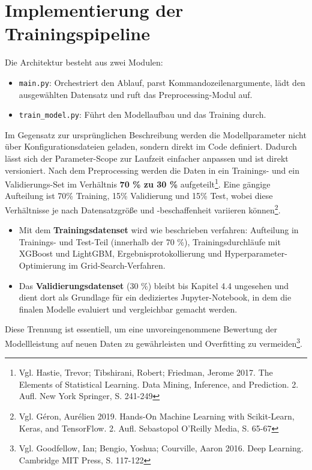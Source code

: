 \section{Implementierung der Trainingspipeline}

Die Architektur besteht aus zwei Modulen:

\begin{itemize}
  \item \texttt{main.py}: Orchestriert den Ablauf, parst Kommandozeilenargumente, lädt den ausgewählten Datensatz und ruft das Preprocessing-Modul auf.
  \item \texttt{train\_model.py}: Führt den Modellaufbau und das Training durch.
\end{itemize}

Im Gegensatz zur ursprünglichen Beschreibung werden die Modellparameter nicht über Konfigurationsdateien geladen, sondern direkt im Code definiert. Dadurch lässt sich der Parameter-Scope zur Laufzeit einfacher anpassen und ist direkt versioniert. Nach dem Preprocessing werden die Daten in ein Trainings- und ein Validierungs-Set im Verhältnis \textbf{70 \% zu 30 \%} aufgeteilt\footnote{Vgl. Hastie, Trevor; Tibshirani, Robert; Friedman, Jerome 2017. The Elements of Statistical Learning. Data Mining, Inference, and Prediction. 2. Aufl. New York Springer, S. 241-249}. Eine gängige Aufteilung ist 70\% Training, 15\% Validierung und 15\% Test, wobei diese Verhältnisse je nach Datensatzgröße und -beschaffenheit variieren können\footnote{Vgl. Géron, Aurélien 2019. Hands-On Machine Learning with Scikit-Learn, Keras, and TensorFlow. 2. Aufl. Sebastopol O'Reilly Media, S. 65-67}.

\begin{itemize}
  \item Mit dem \textbf{Trainingsdatenset} wird wie beschrieben verfahren: Aufteilung in Trainings- und Test-Teil (innerhalb der 70 \%), Trainingsdurchläufe mit XGBoost und LightGBM, Ergebnisprotokollierung und Hyperparameter-Optimierung im Grid-Search-Verfahren.
  \item Das \textbf{Validierungsdatenset} (30 \%) bleibt bis Kapitel 4.4 ungesehen und dient dort als Grundlage für ein dediziertes Jupyter-Notebook, in dem die finalen Modelle evaluiert und vergleichbar gemacht werden.
\end{itemize}

Diese Trennung ist essentiell, um eine unvoreingenommene Bewertung der Modellleistung auf neuen Daten zu gewährleisten und Overfitting zu vermeiden\footnote{Vgl. Goodfellow, Ian; Bengio, Yoshua; Courville, Aaron 2016. Deep Learning. Cambridge MIT Press, S. 117-122}.

